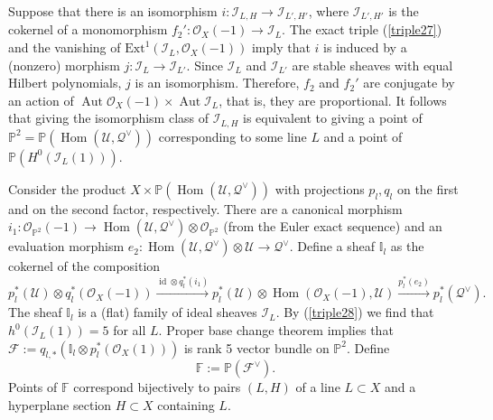 \documentclass{amsart}
\DeclareMathOperator{\Hom}{Hom}
\DeclareMathOperator{\Aut}{Aut}
\def\id{\mathop{\mathrm{id}}\nolimits}
\begin{document}
\begin{enumerate}
Suppose that there is an isomorphism $i:\mathcal I_{L,H}\to\mathcal I_{L',H'}$, where $\mathcal I_{L',H'}$ is the cokernel of a monomorphism $f_2':\mathcal O_X(-1)\to\mathcal I_L$. The exact triple (\ref{triple27}) and the vanishing of $\mathrm{Ext}^1(\mathcal I_L,\mathcal O_X(-1))$ imply that $i$ is induced by a (nonzero) morphism $j:\mathcal I_L\to\mathcal I_{L'}$. Since $\mathcal I_L$ and $\mathcal I_{L'}$ are stable sheaves with equal Hilbert polynomials, $j$ is an isomorphism. Therefore, $f_2$ and $f_2'$ are conjugate by an action of $\Aut \mathcal O_X(-1)\times\Aut\mathcal I_L$, that is, they are proportional. It follows that giving the isomorphism class of $\mathcal I_{L,H}$ is equivalent to giving a point of $\mathbb P^2=\mathbb P(\Hom(\mathcal U,\mathcal Q^\vee))$ corresponding to some line $L$ and a point of $\mathbb P(H^0(\mathcal I_L(1)))$.

Consider the product $X\times\mathbb P(\Hom(\mathcal U,\mathcal Q^\vee))$ with projections $p_l,q_l$ on the first and on the second factor, respectively. There are a canonical morphism $i_1:\mathcal O_{\mathbb P^2}(-1)\to\Hom(\mathcal U,\mathcal Q^\vee)\otimes\mathcal O_{\mathbb P^2}$ (from the Euler exact sequence) and an evaluation morphism $e_2:\Hom(\mathcal U,\mathcal Q^\vee)\otimes\mathcal U\to\mathcal Q^\vee$. Define a sheaf $\mathbb I_l$ as the cokernel of the composition
\begin{equation}\label{I_l}p_l^*(\mathcal U)\otimes q_l^*(\mathcal O_X(-1))\overset{\id\otimes q_l^*(i_1)}{\to}p_l^*(\mathcal U)\otimes\Hom(\mathcal O_X(-1),\mathcal U)\overset{p_l^*(e_2)}{\to}p_l^*(\mathcal Q^\vee).
\end{equation}
The sheaf $\mathbb I_l$ is a (flat) family of ideal sheaves $\mathcal I_L$. By (\ref{triple28}) we find that $h^0(\mathcal I_L(1))=5$ for all $L$. Proper base change theorem implies that $\mathcal F:=q_{l,*}(\mathbb I_l\otimes p_l^*(\mathcal O_X(1)))$ is rank 5 vector bundle on $\mathbb P^2$. Define 
\begin{equation}\label{bbF}\mathbb F:=\mathbb P(\mathcal F^\vee).\end{equation} 
Points of $\mathbb F$ correspond bijectively to pairs $(L,H)$ of a line $L\subset X$ and a hyperplane section $H\subset X$ containing $L$.
 

\end{enumerate}
\end{document}
